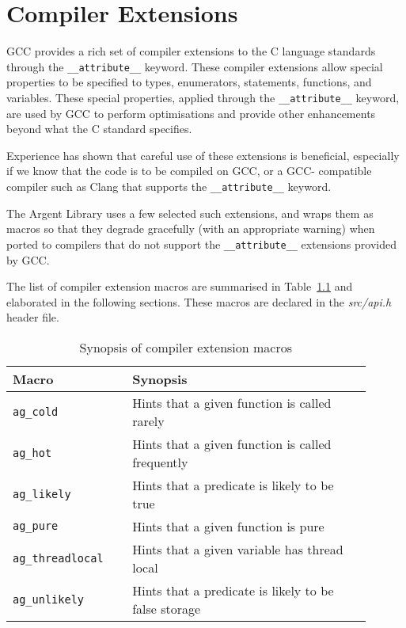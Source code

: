 \chapter{Compiler Extensions}

GCC provides a rich set of compiler extensions to the C language standards
through the \texttt{\_\_attribute\_\_} keyword. These compiler extensions allow 
special properties to be specified to types, enumerators, statements, functions, 
and variables. These special properties, applied through the 
\texttt{\_\_attribute\_\_} keyword, are used by GCC to perform optimisations and
provide other enhancements beyond what the C standard specifies.

Experience has shown that careful use of these extensions is beneficial,
especially if we know that the code is to be compiled on GCC, or a GCC-
compatible compiler such as Clang that supports the 
\texttt{\_\_attribute\_\_} keyword.

The Argent Library uses a few selected such extensions, and wraps them as macros
so that they degrade gracefully (with an appropriate warning) when ported to 
compilers that do not support the \texttt{\_\_attribute\_\_} extensions provided
by GCC.

The list of compiler extension macros are summarised in Table~\ref{tab:synopsis}
and elaborated in the following sections. These macros are declared in the
\emph{src/api.h} header file.

\renewcommand\arraystretch{1.1}
\begin{table}[!htbp]
\centering
\small
\begin{tabular}[t]{>{\centering}m{0.3\linewidth}
    >{\raggedright\arraybackslash}m{0.6\linewidth}}
\toprule
\textbf{Macro} & \textbf{Synopsis} \\
\midrule
\texttt{ag\_cold} & Hints that a given function is called rarely \\
\texttt{ag\_hot} & Hints that a given function is called frequently \\
\texttt{ag\_likely} & Hints that a predicate is likely to be true \\
\texttt{ag\_pure} & Hints that a given function is pure \\
\texttt{ag\_threadlocal} & Hints that a given variable has thread local \\
\texttt{ag\_unlikely} & Hints that a predicate is likely to be false
    storage \\
\bottomrule
\end{tabular}
\caption{Synopsis of compiler extension macros}
\label{tab:synopsis}
\end{table}


